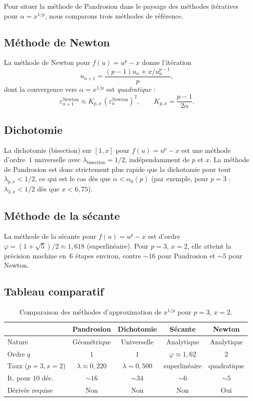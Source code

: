\documentclass[11pt,a4paper]{article}
\theoremstyle{definition}
\newcommand{\eps}{\varepsilon}
\begin{document}
Pour situer la méthode de Pandrosion dans le paysage des méthodes itératives pour $\alpha = x^{1/p}$, nous comparons trois méthodes de référence.

\subsection{Méthode de Newton}

La méthode de Newton pour $f(u) = u^p - x$ donne l'itération
\[
  u_{n+1} = \frac{(p-1)u_n + x/u_n^{p-1}}{p},
\]
dont la convergence vers $\alpha = x^{1/p}$ est \emph{quadratique} :
\[
  \eps_{n+1}^{\text{Newton}} \approx K_{p,x}\,(\eps_n^{\text{Newton}})^2, \qquad K_{p,x} = \frac{p-1}{2\alpha}.
\]

\subsection{Dichotomie}

La dichotomie (bisection) sur $[1, x]$ pour $f(u) = u^p - x$ est une méthode d'ordre~$1$ universelle avec $\lambda_{\text{bisection}} = 1/2$, indépendamment de $p$ et $x$. La méthode de Pandrosion est donc strictement plus rapide que la dichotomie pour tout $\lambda_{p,x} < 1/2$, ce qui est le cas dès que $\alpha < \alpha_0(p)$ (par exemple, pour $p = 3$ : $\lambda_{3,x} < 1/2$ dès que $x < 6{,}75$).

\subsection{Méthode de la sécante}

La méthode de la sécante pour $f(u) = u^p - x$ est d'ordre $\varphi = (1+\sqrt{5})/2 \approx 1{,}618$ (superlinéaire). Pour $p = 3$, $x = 2$, elle atteint la précision machine en~$6$ étapes environ, contre $\sim 16$ pour Pandrosion et $\sim 5$ pour Newton.

\subsection{Tableau comparatif}

\begin{table}[h]
\centering
\renewcommand{\arraystretch}{1.4}
\begin{tabular}{lcccc}
\toprule
& \textbf{Pandrosion} & \textbf{Dichotomie} & \textbf{Sécante} & \textbf{Newton} \\
\midrule
Nature & Géométrique & Universelle & Analytique & Analytique \\
Ordre $q$ & $1$ & $1$ & $\varphi \approx 1{,}62$ & $2$ \\
Taux ($p\!=\!3, x\!=\!2$) & $\lambda \approx 0{,}220$ & $\lambda = 0{,}500$ & superlinéaire & quadratique \\
It. pour $10$ déc. & $\sim 16$ & $\sim 34$ & $\sim 6$ & $\sim 5$ \\
Dérivée requise & Non & Non & Non & Oui \\
\bottomrule
\end{tabular}
\caption{Comparaison des méthodes d'approximation de $x^{1/p}$ pour $p=3$, $x=2$.}
\end{table}
\end{document}

